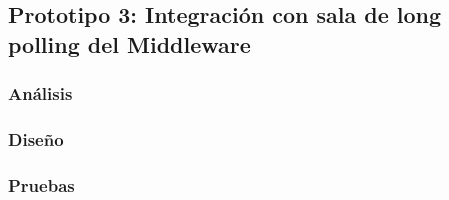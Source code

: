 \subsection{Prototipo 3: Integración con sala de long polling del Middleware}

\subsubsection{Análisis}

\subsubsection{Diseño}

\subsubsection{Pruebas}

